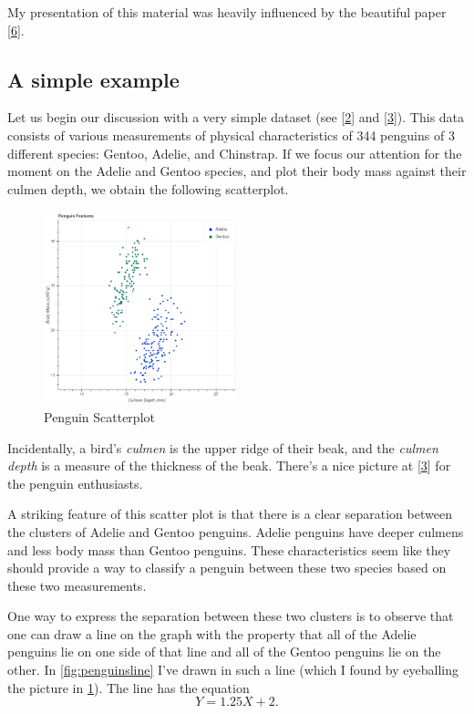 \documentclass[
]{article}
\begin{document}
My presentation of this material was heavily influenced by the beautiful
paper {[}\protect\hyperlink{ref-bennettDuality}{6}{]}.

\hypertarget{a-simple-example}{%
\subsection{A simple example}\label{a-simple-example}}

Let us begin our discussion with a very simple dataset (see
{[}\protect\hyperlink{ref-penguins}{2}{]} and
{[}\protect\hyperlink{ref-penguindata}{3}{]}). This data consists of
various measurements of physical characteristics of 344 penguins of 3
different species: Gentoo, Adelie, and Chinstrap. If we focus our
attention for the moment on the Adelie and Gentoo species, and plot
their body mass against their culmen depth, we obtain the following
scatterplot.

\begin{figure}
\hypertarget{fig:penguins}{%
\centering
\includegraphics[width=0.5\textwidth,height=\textheight]{../img/penguins.png}
\caption{Penguin Scatterplot}\label{fig:penguins}
}
\end{figure}

Incidentally, a bird's \emph{culmen} is the upper ridge of their beak,
and the \emph{culmen depth} is a measure of the thickness of the beak.
There's a nice picture at {[}\protect\hyperlink{ref-penguindata}{3}{]}
for the penguin enthusiasts.

A striking feature of this scatter plot is that there is a clear
separation between the clusters of Adelie and Gentoo penguins. Adelie
penguins have deeper culmens and less body mass than Gentoo penguins.
These characteristics seem like they should provide a way to classify a
penguin between these two species based on these two measurements.

One way to express the separation between these two clusters is to
observe that one can draw a line on the graph with the property that all
of the Adelie penguins lie on one side of that line and all of the
Gentoo penguins lie on the other. In \cref{fig:penguinsline} I've drawn
in such a line (which I found by eyeballing the picture in
\cref{fig:penguins}). The line has the equation \[
Y = 1.25X+2.
\]
\end{document}
